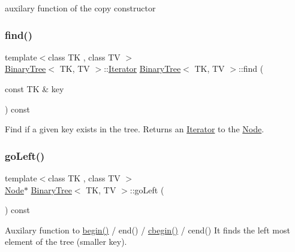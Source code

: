 auxilary function of the copy constructor \mbox{\label{classBinaryTree_ab7ca7386a799bd4ec8cece3a0e15d7e3}} 
\subsubsection{\texorpdfstring{find()}{find()}}
{\footnotesize\ttfamily template$<$class TK , class TV $>$ \\
\mbox{\hyperlink{classBinaryTree}{Binary\+Tree}}$<$ TK, TV $>$\+::\mbox{\hyperlink{classBinaryTree_1_1Iterator}{Iterator}} \mbox{\hyperlink{classBinaryTree}{Binary\+Tree}}$<$ TK, TV $>$\+::find (\begin{DoxyParamCaption}\item[{const TK \&}]{key }\end{DoxyParamCaption}) const}

Find if a given key exists in the tree. Returns an \mbox{\hyperlink{classBinaryTree_1_1Iterator}{Iterator}} to the \mbox{\hyperlink{structBinaryTree_1_1Node}{Node}}. \mbox{\label{classBinaryTree_a5b7168f283acc83b39e5af15b9817b47}} 
\subsubsection{\texorpdfstring{goLeft()}{goLeft()}}
{\footnotesize\ttfamily template$<$class TK , class TV $>$ \\
\mbox{\hyperlink{structBinaryTree_1_1Node}{Node}}$\ast$ \mbox{\hyperlink{classBinaryTree}{Binary\+Tree}}$<$ TK, TV $>$\+::go\+Left (\begin{DoxyParamCaption}{ }\end{DoxyParamCaption}) const\hspace{0.3cm}{\ttfamily [inline]}}

Auxilary function to \mbox{\hyperlink{classBinaryTree_a828acf65e70cf4b6e106807a052ca508}{begin()}} / end() / \mbox{\hyperlink{classBinaryTree_afc1bfd2d748acb391605ffcf8c86439d}{cbegin()}} / cend() It finds the left most element of the tree (smaller key). \mbox{\label{classBinaryTree_a356114cfeed3598a9a37907eafed7b25}} 
